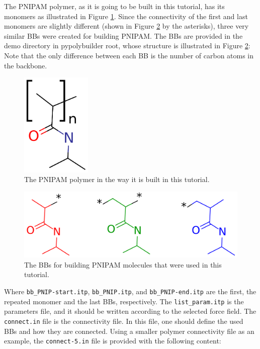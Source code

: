 
The PNIPAM polymer, as it is going to be built in this tutorial, has its monomers as illustrated in Figure \ref{fig:PNIPAMPOL}.
Since the connectivity of the first and last monomers are slightly different (shown in Figure \ref{fig:PNIPAMBBs} by the asterisks), three very similar BBs were created for building PNIPAM.
The BBs are provided in the demo directory in pypolybuilder root, whose structure is illustrated in Figure \ref{fig:PNIPAMBBs}:
Note that the only difference between each BB is the number of carbon atoms in the backbone.

\begin{figure}
    \center
    \includegraphics[width=0.3\textwidth]{PNIPAM/PNIPAMPOL.png}
    \caption{The PNIPAM polymer in the way it is built in this tutorial.}
    \label{fig:PNIPAMPOL}
\end{figure}

\begin{figure}
    \centering
    \includegraphics[width=\textwidth]{PNIPAM/PNIPAMBBs.png}
    \caption{The BBs for building PNIPAM molecules that were used in this tutorial.}
    \label{fig:PNIPAMBBs}
\end{figure}


Where \texttt{bb\_PNIP-start.itp}, \texttt{bb\_PNIP.itp}, and \texttt{bb\_PNIP-end.itp} are the first, the repeated monomer and the last BBs, respectively.
The \texttt{list\_param.itp} is the parameters file, and it should be written according to the selected force field.
The \texttt{connect.in} file is the connectivity file.
In this file, one should define the used BBs and how they are connected.
Using a smaller polymer connectivity file as an example, the \texttt{connect-5.in} file is provided with the following content:

